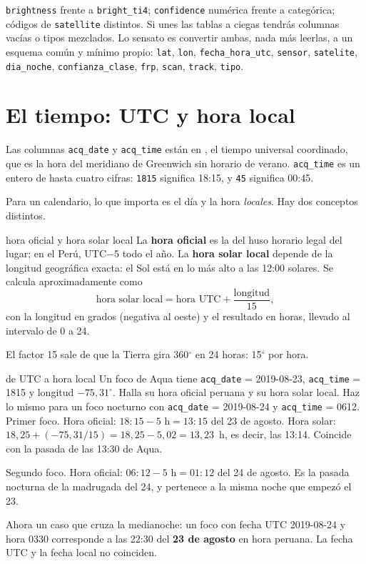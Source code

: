 \begin{atencion}
\texttt{brightness} frente a \texttt{bright\_ti4}; \texttt{confidence} numérica frente a
categórica; códigos de \texttt{satellite} distintos. Si unes las tablas a ciegas tendrás
columnas vacías o tipos mezclados. Lo sensato es convertir ambas, nada más leerlas, a un
esquema común y mínimo propio: \texttt{lat}, \texttt{lon}, \texttt{fecha\_hora\_utc},
\texttt{sensor}, \texttt{satelite}, \texttt{dia\_noche}, \texttt{confianza\_clase},
\texttt{frp}, \texttt{scan}, \texttt{track}, \texttt{tipo}.
\end{atencion}

\section{El tiempo: UTC y hora local}

Las columnas \texttt{acq\_date} y \texttt{acq\_time} están en , el tiempo universal
coordinado, que es la hora del meridiano de Greenwich sin horario de verano. \texttt{acq\_time}
es un entero de hasta cuatro cifras: \texttt{1815} significa 18:15, y \texttt{45} significa
00:45.

Para un calendario, lo que importa es el día y la hora \emph{locales}. Hay dos conceptos
distintos.

\begin{definicion}{hora oficial y hora solar local}
La \textbf{hora oficial} es la del huso horario legal del lugar; en el Perú, UTC$-$5 todo el
año. La \textbf{hora solar local} depende de la longitud geográfica exacta: el Sol está en lo
más alto a las 12:00 solares. Se calcula aproximadamente como
\begin{equation}\label{eq:hsl}
  \text{hora solar local} = \text{hora UTC} + \frac{\text{longitud}}{15},
\end{equation}
con la longitud en grados (negativa al oeste) y el resultado en horas, llevado al intervalo de
0 a 24.
\end{definicion}

El factor 15 sale de que la Tierra gira 360$^\circ$ en 24 horas: 15$^\circ$ por hora.

\begin{ejemplo}{de UTC a hora local}
Un foco de Aqua tiene \texttt{acq\_date} = 2019-08-23, \texttt{acq\_time} = 1815 y longitud
$-75{,}31^\circ$. Halla su hora oficial peruana y su hora solar local. Haz lo mismo para un
foco nocturno con \texttt{acq\_date} = 2019-08-24 y \texttt{acq\_time} = 0612.
\solucion Primer foco. Hora oficial: $18{:}15 - 5\text{ h} = 13{:}15$ del 23 de agosto. Hora
solar: $18{,}25 + (-75{,}31/15) = 18{,}25 - 5{,}02 = 13{,}23$~h, es decir, las 13:14. Coincide
con la pasada de las 13:30 de Aqua.

Segundo foco. Hora oficial: $06{:}12 - 5\text{ h} = 01{:}12$ del 24 de agosto. Es la pasada
nocturna de la madrugada del 24, y pertenece a la misma noche que empezó el 23.

Ahora un caso que cruza la medianoche: un foco con fecha UTC 2019-08-24 y hora 0330 corresponde
a las 22:30 del \textbf{23 de agosto} en hora peruana. La fecha UTC y la fecha local no
coinciden.
\end{ejemplo}

